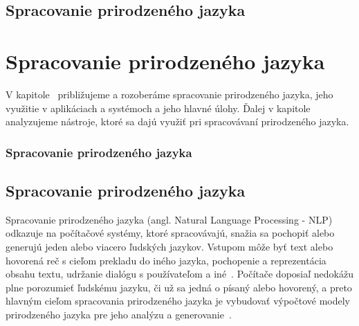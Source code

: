 \newpage
%
%
{
	\section{Spracovanie prirodzeného jazyka} 
}
{
	\chapter{Spracovanie prirodzeného jazyka}
}
V kapitole~ približujeme a rozoberáme spracovanie prirodzeného jazyka, jeho využitie v aplikáciach a systémoch a jeho hlavné úlohy. Ďalej v kapitole~ analyzujeme nástroje, ktoré sa dajú využiť pri spracovávaní prirodzeného jazyka.

%
%
{
	\subsection{Spracovanie prirodzeného jazyka}
}
{
	\section{Spracovanie prirodzeného jazyka}
}
\label{subsec:nlp}
Spracovanie prirodzeného jazyka (angl. Natural Language Processing - NLP) odkazuje na počítačové systémy, ktoré spracovávajú, snažia sa pochopiť alebo generujú jeden alebo viacero ľudských jazykov. Vstupom môže byť text alebo hovorená reč s cieľom prekladu do iného jazyka, pochopenie a reprezentácia obsahu textu, udržanie dialógu s používateľom a iné~\cite{AllenNLP}. Počítače doposiaľ nedokážu plne porozumieť ľudskému jazyku, či už sa jedná o písaný alebo hovorený, a preto hlavným cieľom spracovania prirodzeného jazyka je vybudovať výpočtové modely prirodzeného jazyka pre jeho analýzu a generovanie~\cite{Bharati1995}.

